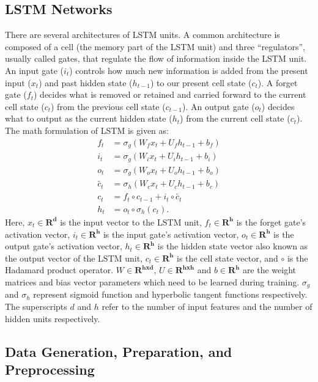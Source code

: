 \documentclass[aps,prl,twocolumn,superscriptaddress,tightenlines,longbibliography, reprint]{revtex4-1}
\begin{document}
\subsection{LSTM Networks}
There are several architectures of LSTM units. A common architecture is composed of a cell (the memory part of the LSTM unit) and three ``regulators'', usually called gates, that regulate the flow of information inside the LSTM unit. An input gate ($i_t$) controls how much new information is added from the present input ($x_t$) and past hidden state ($h_{t-1}$) to our present cell state ($c_{t}$). A forget gate ($f_t$) decides what is removed or retained and carried forward to the current cell state ($c_{t}$) from the previous cell state ($c_{t-1}$). An output gate ($o_t$) decides what to output as the current hidden state ($h_t$) from the current cell state ($c_{t}$).
The math formulation of LSTM is given as:
\begin{align} 
f_t &=\sigma_g (W_f x_t + U_f h_{t-1} + b_f) \nonumber \\ 
i_t &=\sigma_g (W_i x_t + U_i h_{t-1} + b_i) \nonumber \\
o_t &=\sigma_g (W_o x_t + U_o h_{t-1} + b_o) \nonumber\\
\tilde{c_t} &=\sigma_h (W_c x_t + U_c h_{t-1} + b_c) \nonumber \\
c_t &= f_t \circ c_{t-1} + i_t \circ \tilde{c_t} \nonumber \\
h_t &= o_t \circ \sigma_h(c_t).
\end{align}
Here, $x_t \in \mathbf{R^d}$ is the input vector to the LSTM unit, $f_t \in \mathbf{R^h}$ is the forget gate's activation vector, $i_t \in \mathbf{R^h}$ is the input gate's activation vector, $o_t \in \mathbf{R^h}$ is the output gate's activation vector, $h_t \in \mathbf{R^h}$ is the hidden state vector also known as the output vector of the LSTM unit, $c_t \in \mathbf{R^h}$ is the cell state vector, and $\circ$ is the Hadamard  product operator.  $W \in \mathbf{R^{hxd}}$, $U \in \mathbf{R^{hxh}}$ and $b \in \mathbf{R^h}$ are the weight matrices and bias vector parameters which need to be learned during training. $\sigma_g$ and $\sigma_h$ represent sigmoid function and hyperbolic tangent functions respectively. The superscripts $d$ and $h$ refer to the number of input features and the number of hidden units respectively.

\subsection{Data Generation, Preparation, and Preprocessing}
\end{document}
